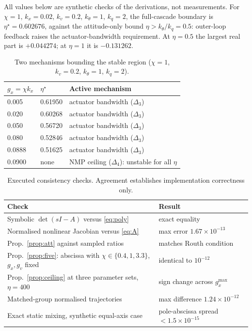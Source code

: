 \documentclass[11pt,a4paper]{article}
\begin{document}
All values below are synthetic checks of the derivations, not measurements.
For $\chi=1$, $k_x=0.02$, $k_v=0.2$, $k_\theta=1$, $k_q=2$, the full-cascade boundary is
$\eta^\star=0.602676$, against the attitude-only bound $\eta>k_\theta/k_q=0.5$: outer-loop feedback
raises the actuator-bandwidth requirement. At $\eta=0.5$ the largest real part is $+0.044274$; at
$\eta=1$ it is $-0.131262$.

\begin{table}[h]\centering
\caption{Two mechanisms bounding the stable region ($\chi=1$, $k_v=0.2$, $k_\theta=1$, $k_q=2$).}
\label{tab:mech}
\begin{tabular}{lll}
\toprule
$g_x=\chi k_x$ & $\eta^\star$ & Active mechanism \\
\midrule
0.005  & 0.61950 & actuator bandwidth ($\Delta_3$) \\
0.020  & 0.60268 & actuator bandwidth ($\Delta_3$) \\
0.050  & 0.56720 & actuator bandwidth ($\Delta_3$) \\
0.080  & 0.52846 & actuator bandwidth ($\Delta_3$) \\
0.0888 & 0.51625 & actuator bandwidth ($\Delta_3$) \\
0.0900 & none    & NMP ceiling ($\Delta_4$): unstable for all $\eta$ \\
\bottomrule
\end{tabular}
\end{table}

\begin{table}[h]\centering
\caption{Executed consistency checks. Agreement establishes implementation correctness only.}
\begin{tabular}{ll}
\toprule
Check & Result \\
\midrule
Symbolic $\det(sI-A)$ versus \eqref{eq:poly} & exact equality \\
Normalised nonlinear Jacobian versus \eqref{eq:A} & max error $1.67\times10^{-13}$ \\
Prop.~\ref{prop:att} against sampled ratios & matches Routh condition \\
Prop.~\ref{prop:five}: abscissa with $\chi\in\{0.4,1,3.3\}$, $g_x,g_v$ fixed & identical to $10^{-12}$ \\
Prop.~\ref{prop:ceiling} at three parameter sets, $\eta=400$ & sign change across $g_x^{\max}$ \\
Matched-group normalised trajectories & max difference $1.24\times10^{-12}$ \\
Exact static mixing, synthetic equal-axis case & pole-abscissa spread $<1.5\times10^{-15}$ \\
\bottomrule
\end{tabular}
\end{table}
\end{document}
